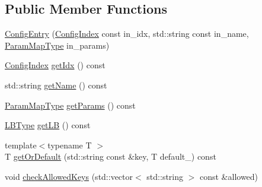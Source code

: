 \subsection*{Public Member Functions}
\begin{DoxyCompactItemize}
\item 
\hyperlink{structvt_1_1vrt_1_1collection_1_1balance_1_1_config_entry_a83f2baf2d7eea59fee6aeccb85fa6ca2}{Config\+Entry} (\hyperlink{namespacevt_1_1vrt_1_1collection_1_1balance_ac1bb9eee8129549177880dbb4e5f6a34}{Config\+Index} const in\+\_\+idx, std\+::string const in\+\_\+name, \hyperlink{structvt_1_1vrt_1_1collection_1_1balance_1_1_config_entry_a23bc47f965b2069f4015c839a9e1f66d}{Param\+Map\+Type} in\+\_\+params)
\item 
\hyperlink{namespacevt_1_1vrt_1_1collection_1_1balance_ac1bb9eee8129549177880dbb4e5f6a34}{Config\+Index} \hyperlink{structvt_1_1vrt_1_1collection_1_1balance_1_1_config_entry_aaf70eb658ff7c6407d9f97d350ab2bbe}{get\+Idx} () const
\item 
std\+::string \hyperlink{structvt_1_1vrt_1_1collection_1_1balance_1_1_config_entry_acc6cbc46c2705f6086dac596c7fc843c}{get\+Name} () const
\item 
\hyperlink{structvt_1_1vrt_1_1collection_1_1balance_1_1_config_entry_a23bc47f965b2069f4015c839a9e1f66d}{Param\+Map\+Type} \hyperlink{structvt_1_1vrt_1_1collection_1_1balance_1_1_config_entry_a5709e3d384a5912e34885517a39c40fc}{get\+Params} () const
\item 
\hyperlink{namespacevt_1_1vrt_1_1collection_1_1balance_ac4f99693509affcc67db182d4aad9b5c}{L\+B\+Type} \hyperlink{structvt_1_1vrt_1_1collection_1_1balance_1_1_config_entry_a747b6a7a452f5ddeab74303eeae8878d}{get\+LB} () const
\item 
{\footnotesize template$<$typename T $>$ }\\T \hyperlink{structvt_1_1vrt_1_1collection_1_1balance_1_1_config_entry_a25e1591fe8d041a8aa9f01f8bb3e9d58}{get\+Or\+Default} (std\+::string const \&key, T default\+\_\+) const
\item 
void \hyperlink{structvt_1_1vrt_1_1collection_1_1balance_1_1_config_entry_ab4cc68a4675c9480c3086596b7afbb6e}{check\+Allowed\+Keys} (std\+::vector$<$ std\+::string $>$ const \&allowed)
\end{DoxyCompactItemize}
